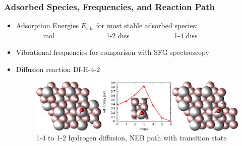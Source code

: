 \documentclass[hyperref={pdfpagelabels=false}]{beamer}
\begin{document}
\begin{frame}
 \frametitle{Adsorbed Species, Frequencies, and Reaction Path}
 \begin{itemize}
 \item Adsorption Energies $E_\textrm{ads}$ for most stable adsorbed species:\\~~~~~~~ mol ~~~~~~~~~~~~~~1-2 diss ~~~~~~~~~~~~1-4 diss
 \begin{figure}
  \centering
 \end{figure}
 \pause
 \item Vibrational frequencies for comparison with SFG spectroscopy
 \pause
 \item Diffusion reaction Df-H-4-2
 \begin{figure}
  \centering
  \includegraphics[width=.7\textwidth]{figures/df-h-4-2.pdf}
  \caption{1-4 to 1-2 hydrogen diffusion, NEB path with transition state}
 \end{figure}
 \end{itemize}
\end{frame}
\end{document}
